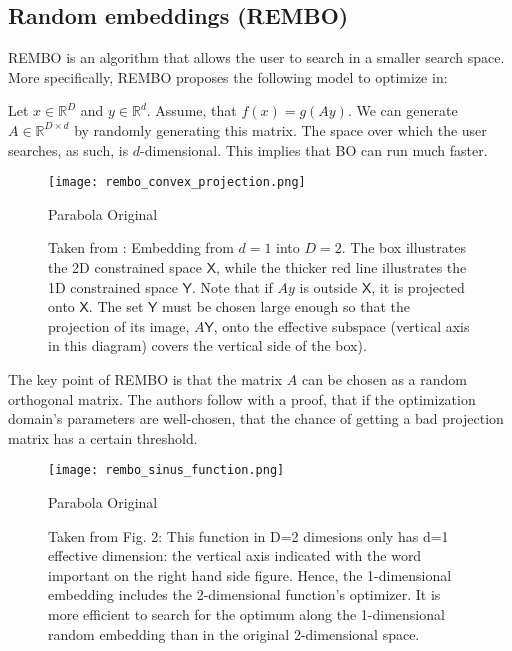 \subsection{Random embeddings (REMBO)}
REMBO is an algorithm that allows the user to search in a smaller search space.
More specifically, REMBO proposes the following model to optimize in:


\citep{Wang2013} Let $x \in \mathbb{R}^D$ and $y \in \mathbb{R}^d$. Assume, that $f(x) = g(Ay)$. We can generate $A \in \mathbb{R}^{D \times d}$ by randomly generating this matrix.
The space over which the user searches, as such, is $d$-dimensional.
This implies that BO can run much faster. \\

\begin{figure}[H]
    \centering
        \texttt{[image: rembo\_convex\_projection.png]}
        \caption{Parabola Original}
        \label{fig:gull}
    \caption{
    Taken from \citep{Wang2013}: Embedding from $d = 1$ into $D=2$.
    The box illustrates the 2D constrained space $\mathsf{X}$, while the thicker red line illustrates the 1D constrained space $\mathsf{Y}$.
    Note that if $Ay$ is outside $\mathsf{X}$, it is projected onto $\mathsf{X}$.
    The set $\mathsf{Y}$ must be chosen large enough so that the projection of its image, $A\mathsf{Y}$, onto the effective subspace (vertical axis in this diagram) covers the vertical side of the box).
    }\label{fig:animals}
\end{figure}

The key point of REMBO is that the matrix $A$ can be chosen as a random orthogonal matrix.
The authors follow with a proof, that if the optimization domain's parameters are well-chosen, that the chance of getting a bad projection matrix has a certain threshold. \\

\begin{figure}[H]
    \centering
        \texttt{[image: rembo\_sinus\_function.png]}
        \caption{Parabola Original}
        \label{fig:gull}
    \caption{
    Taken from \citep{Wang2013} Fig. 2: This function in D=2 dimesions only has d=1 effective dimension: the vertical axis indicated with the word important on the right hand side figure. 
    Hence, the 1-dimensional embedding includes the 2-dimensional function’s optimizer. 
    It is more efficient to search for the optimum along the 1-dimensional random embedding than in the original 2-dimensional space.
    }\label{fig:animals}
\end{figure}

